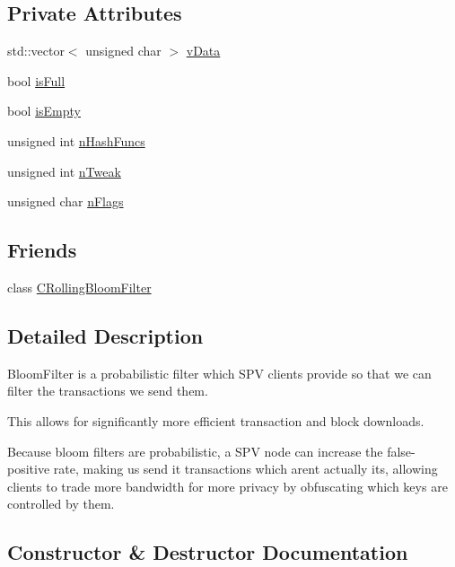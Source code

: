 \subsection*{Private Attributes}
\begin{DoxyCompactItemize}
\item 
std\+::vector$<$ unsigned char $>$ \mbox{\hyperlink{class_c_bloom_filter_a494abe120d62978951cc0f0db916f50e}{v\+Data}}
\item 
bool \mbox{\hyperlink{class_c_bloom_filter_a4ded8502360023ed194686c0b8df635d}{is\+Full}}
\item 
bool \mbox{\hyperlink{class_c_bloom_filter_a3db306b7ea8e7dc6281b36de9ca6750a}{is\+Empty}}
\item 
unsigned int \mbox{\hyperlink{class_c_bloom_filter_a5538222a099be8261258526204b1f1dd}{n\+Hash\+Funcs}}
\item 
unsigned int \mbox{\hyperlink{class_c_bloom_filter_af372d9a72fd69dc5e9f31e38ab84bf29}{n\+Tweak}}
\item 
unsigned char \mbox{\hyperlink{class_c_bloom_filter_a3368a76443d81e0349debe514a524dfb}{n\+Flags}}
\end{DoxyCompactItemize}
\subsection*{Friends}
\begin{DoxyCompactItemize}
\item 
class \mbox{\hyperlink{class_c_bloom_filter_a07025fbd4f30c098b492afea8e004cd8}{C\+Rolling\+Bloom\+Filter}}
\end{DoxyCompactItemize}


\subsection{Detailed Description}
Bloom\+Filter is a probabilistic filter which S\+PV clients provide so that we can filter the transactions we send them.

This allows for significantly more efficient transaction and block downloads.

Because bloom filters are probabilistic, a S\+PV node can increase the false-\/ positive rate, making us send it transactions which aren\textquotesingle{}t actually its, allowing clients to trade more bandwidth for more privacy by obfuscating which keys are controlled by them. 

\subsection{Constructor \& Destructor Documentation}
\mbox{\label{class_c_bloom_filter_a5ef6ddc09c07e6b921934a84cd770395}} 
